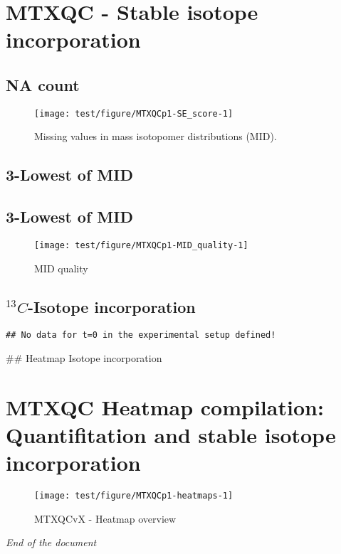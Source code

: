 \documentclass[9pt,]{article}
\begin{document}
\section{MTXQC - Stable isotope
incorporation}\label{mtxqc---stable-isotope-incorporation}

\subsection{NA count}\label{na-count}

\begin{figure}

{\centering \texttt{[image: test/figure/MTXQCp1-SE\_score-1]} 

}

\caption{Missing values in mass isotopomer distributions (MID).}\label{fig:SE_score}
\end{figure}

\subsection{3-Lowest of MID}\label{lowest-of-mid}

\subsection{3-Lowest of MID}\label{lowest-of-mid-1}

\begin{figure}

{\centering \texttt{[image: test/figure/MTXQCp1-MID\_quality-1]} 

}

\caption{MID quality}\label{fig:MID_quality}
\end{figure}

\subsection{\texorpdfstring{\(^{13}C\)-Isotope
incorporation}{\^{}\{13\}C-Isotope incorporation}}\label{c-isotope-incorporation}

\begin{verbatim}
## No data for t=0 in the experimental setup defined!
\end{verbatim}

\clearpage
\#\# Heatmap Isotope incorporation

\section{MTXQC Heatmap compilation: Quantifitation and stable isotope
incorporation}\label{mtxqc-heatmap-compilation-quantifitation-and-stable-isotope-incorporation}

\begin{figure}

{\centering \texttt{[image: test/figure/MTXQCp1-heatmaps-1]} 

}

\caption{MTXQCvX - Heatmap overview}\label{fig:heatmaps}
\end{figure}

\emph{End of the document}
\newpage
\singlespacing 
\end{document}
